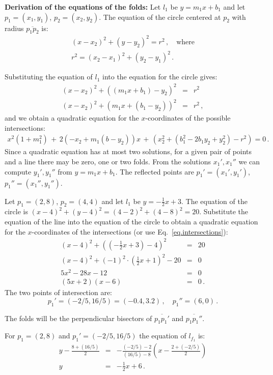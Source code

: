 \noindent\textbf{Derivation of the equations of the folds:}
Let $l_1$ be $y=m_1x + b_1$ and let $p_1=(x_1,y_1)$, $p_2=(x_2,y_2)$. The equation of the circle centered at $p_2$ with radius $\overline{p_1p_2}$ is:
\begin{eqnarray*}
(x-x_2)^2 + (y-y_2)^2 = r^2\,,\quad \textrm{where}\\
r^2= (x_2-x_1)^2 + (y_2-y_1)^2\,.
\end{eqnarray*}

\newpage

Substituting the equation of $l_1$ into the equation for the circle gives:
\begin{eqnarray*}
(x-x_2)^2+((m_1x+b_1)-y_2)^2&=&r^2\\
(x-x_2)^2+(m_1x+(b_1-y_2))^2&=&r^2\,,
\end{eqnarray*}
and we obtain a quadratic equation for the $x$-coordinates of the possible intersections:
\begin{align}
x^2(1+m_1^2) \,+\, 2(-x_2+m_1(b-y_2))x \,+\,(x_2^2 + (b_1^2 - 2b_1y_2+y_2^2)-r^2)=0\,.\label{eq.intersections}
\end{align}
Since a quadratic equation has at most two solutions, for a given pair of points and a line there may be zero, one or two folds. From the solutions $x_1',x_1''$ we can compute $y_1',y_1''$ from $y=m_1x+b_1$. The reflected points are $p_1'=(x_1',y_1')$, $p_1''=(x_1'',y_1'')$.
\begin{example}
Let $p_1=(2,8)$, $p_2=(4,4)$ and let $l_1$ be $y=-\frac{1}{2}x +3$. The equation of the circle is $(x-4)^2 + (y-4)^2 = (4-2)^2+(4-8)^2=20$. Substitute the equation of the line into the equation of the circle to obtain a quadratic equation for the $x$-coordinates of the intersections (or use Eq.~\ref{eq.intersections}):
\begin{eqnarray*}
(x-4)^2 + \left(\left(-\frac{1}{2}x+3\right)-4\right)^2&=&20\\
(x-4)^2 + (-1)^2\cdot\left(\frac{1}{2}x+1\right)^2-20&=&0\\
5x^2 -28x -12&=&0\\
(5x+2)(x-6)&=&0\,.
\end{eqnarray*}
The two points of intersection are:
\[
p_1'=(-2/5,16/5) = (-0.4,3.2)\,,\quad p_1''=(6,0)\,.
\]
\end{example}
The folds will be the perpendicular bisectors of $\overline{p_1p_1'}$ and $\overline{p_1p_1''}$.
\begin{example}
For $p_1=(2,8)$ and $p_1'=(-2/5,16/5)$ the equation of $l_{f_1}$  is:
\begin{eqnarray*}
y-\frac{8+(16/5)}{2}&=&-\frac{(-2/5)-2}{(16/5)-8}\left(x-\frac{2+\left(-2/5\right)}{2}\right)\\
y&=&-\frac{1}{2}x+6\,.
\end{eqnarray*}
\end{example}

